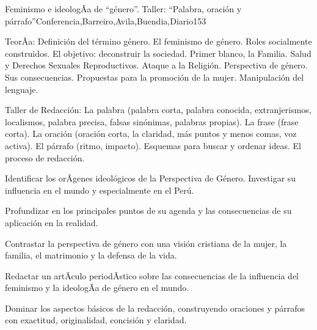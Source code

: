 \begin{syllabus}
\begin{unit}{Feminismo e ideologÃ­a de ``género''. Taller: ``Palabra, oración y párrafo''}{Conferencia,Barreiro,Avila,Buendia,Diario}{15}{3}
\begin{topics}
	\item TeorÃ­a: 
		\subitem Definición del término género. El feminismo de género. Roles socialmente construidos. El objetivo: deconstruir la sociedad. Primer blanco, la Familia. Salud y Derechos Sexuales Reproductivos. Ataque a la Religión.
		\subitem Perspectiva de género. Sus consecuencias. Propuestas para la promoción de la mujer.
		\subitem Manipulación del lenguaje.

	\item Taller de Redacción:
 		\subitem La palabra (palabra corta, palabra conocida, extranjerismos, localismos, palabra precisa, falsas sinónimas, palabras propias).
 		\subitem La frase (frase corta).
 		\subitem La oración (oración corta, la claridad, más puntos y menos comas, voz activa).
 		\subitem El párrafo (ritmo, impacto). 
 		\subitem Esquemas para buscar y ordenar ideas.
 		\subitem El proceso de redacción.
\end{topics}
\begin{unitgoals}
	\item Identificar los orÃ­genes ideológicos de la Perspectiva de Género. Investigar su influencia en el mundo y especialmente en el Perú. 	
	\item Profundizar en los principales puntos de su agenda y las consecuencias de su aplicación en la realidad. 	
	\item Contrastar la perspectiva de género con una visión cristiana de la mujer, la familia, el matrimonio y la defensa de la vida.
	\item Redactar un artÃ­culo periodÃ­stico sobre las consecuencias de la influencia del feminismo y la ideologÃ­a de género en el mundo. 	
	\item Dominar los aspectos básicos de la redacción, construyendo oraciones y párrafos con exactitud, originalidad, concisión y claridad.

\end{unitgoals}
\end{unit}


\end{syllabus}
